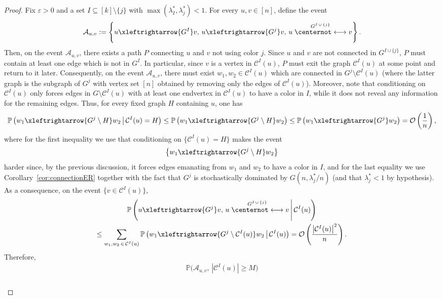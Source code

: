 \documentclass[10pt]{amsart}
\theoremstyle{definition}\newtheorem{defi}[theo]{Definition}\newtheorem{rema}[theo]{Remark}\newtheorem{exam}[theo]{Example}\newtheorem{exem}[theo]{Example}\newtheorem{nota}[theo]{Notation}
\renewcommand{\Pr}{\mathbb{P}}
\newcommand{\cO}{\mathcal{O}}
\newcommand{\cC}{\mathcal{C}}
\newcommand{\cA}{\mathcal{A}}
\begin{document}
\begin{proof}
Fix $\varepsilon>0$ and a set $I\subseteq [k]\setminus \{j\}$ with $\max(\lambda_I^*,\lambda_j^*)<1$. For every $u,v\in [n]$, define the event
\[
\cA_{u,v}:=\left\{u\xleftrightarrow{G^I}v, \, u\xleftrightarrow{G^j}v, \, u\stackrel{G^{I\,\cup\,\{j\}}}{\centernot\longleftrightarrow} v\right\}.
\]
Then, on the event $\cA_{u,v}$, there exists a path $P$ connecting $u$ and $v$ not using color $j$. Since $u$ and $v$ are not connected in $G^{I\cup \{j\}}$, $P$ must contain at least one edge which is not in $G^I$. In particular, since $v$ is a vertex in $\cC^I(u)$, $P$ must exit the graph $\cC^I(u)$ at some point and return to it later. Consequently, on the event $\cA_{u,v}$, there must exist $w_1,w_2 \in \cC^I(u)$ which are connected in $G^j\setminus \cC^I(u)$ (where the latter graph is the subgraph of $G^j$ with vertex set $[n]$ obtained by removing only the edges of $\cC^I(u)$). Moreover, note that conditioning on $\cC^I(u)$ only forces edges in $G\setminus \cC^I(u)$ with at least one endvertex in $\cC^I(u)$ to have a color in $I$, while it does not reveal any information for the remaining edges. Thus, for every fixed graph $H$ containing $u$, one has
\[
\Pr\left(w_1\xleftrightarrow{G^j\setminus H}w_2
\,\middle|\, \cC^I(u)=H\right) \le \Pr\left(w_1\xleftrightarrow{G^j\setminus H}w_2\right) \le \Pr\left(w_1\xleftrightarrow{G^j}w_2\right) = \cO\left(\frac 1n\right),
\]
where for the first inequality we use that conditioning on $\{\cC^I(u)=H\}$ makes the event
\[
\left\{w_1\xleftrightarrow{G^j\setminus H}w_2\right\}
\]
harder since, by the previous discussion, it forces edges emanating from $w_1$ and $w_2$ to have a color in $I$, and for the last equality we use Corollary~\ref{cor:connectionER} together with the fact that $G^j$ is stochastically dominated by $G(n,\lambda_j^*/n)$ (and that $\lambda_j^*<1$ by hypothesis). As a consequence, on the event $\{v\in \cC^I(u)\}$,
\begin{multline*}
\Pr\left(u\xleftrightarrow{G^j}v, \, u\stackrel{G^{I\,\cup\,\{j\}}}{\centernot\longleftrightarrow} v
\,\middle|\, \cC^I(u)\right) \\
\le \sum_{w_1,w_2\,\in\,\cC^I(u)}
\Pr\left(w_1\xleftrightarrow{G^j\setminus \cC^I(u)}w_2\,
\middle|\, \cC^I(u)\right)
= \cO\left(\frac{\left|\cC^I(u)\right|^2}{n}\right).
\end{multline*}
Therefore,
\begin{multline}\label{eq:part 1}
\Pr\big(\cA_{u,v}, \, \left|\cC^I(u)\right|\ge M\big)\\
\begin{aligned}

\end{aligned}
\end{multline}
\end{proof}
\end{document}
